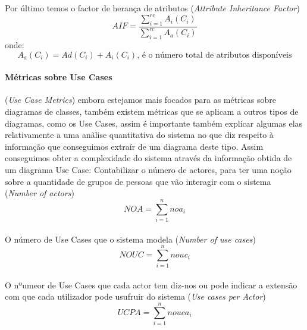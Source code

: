 Por último temos o factor de herança de atributos (\textit{Attribute Inheritance Factor}) $$AIF = \frac{\sum_{i=1}^{rc} A_i(C_i)}{\sum_{i=1}^{rc} A_a(C_i)} $$
onde:
$$ A_a(C_i) = Ad(C_i) + A_i(C_i)\textrm{, é o número total de atributos disponíveis}$$
\paragraph{Métricas sobre Use Cases} (\textit{Use Case Metrics}) embora estejamos mais focados para as métricas sobre diagramas de classes,
também existem métricas que se aplicam a outros tipos de diagramas, como os Use Cases, assim é importante também explicar algumas elas
relativamente a uma anãlise quantitativa do sistema no que diz respeito à informação que conseguimos extraír de um diagrama deste tipo.
Assim conseguimos obter a complexidade do sistema através da informação obtida de um diagrama Use Case:
Contabilizar o número de actores, para ter uma noção sobre a quantidade de grupos de pessoas que
vão interagir com o sistema (\textit{Number of actors})  $$NOA = \sum_{i=1}^{n} noa_i $$
\\
O número de Use Cases que o sistema modela (\textit{Number of use cases})  $$NOUC = \sum_{i=1}^{n} nouc_i $$
\\
O nºumeor de Use Cases que cada actor tem diz-nos ou pode indicar a extensão com que cada utilizador pode
usufruir do sistema (\textit{Use cases per Actor}) $$UCPA = \sum_{i=1}^{n} nouca_i $$
